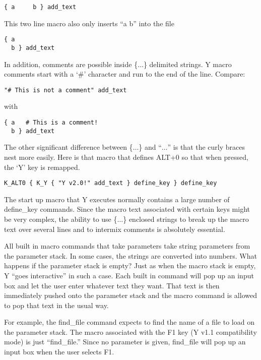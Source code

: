 \begin{verbatim}
{ a     b } add_text
\end{verbatim}

This two line macro also only inserts ``a b'' into the file

\begin{verbatim}
{ a
  b } add_text
\end{verbatim}

In addition, comments are possible inside \{$\ldots$\} delimited strings. Y macro comments start
with a `\#' character and run to the end of the line. Compare:

\begin{verbatim}
"# This is not a comment" add_text
\end{verbatim}

with

\begin{verbatim}
{ a   # This is a comment!
  b } add_text
\end{verbatim}

The other significant difference between \{$\ldots$\} and ``$\ldots$'' is that the curly braces
nest more easily. Here is that macro that defines ALT+0 so that when pressed, the `Y' key is
remapped.

\begin{verbatim}
K_ALT0 { K_Y { "Y v2.0!" add_text } define_key } define_key
\end{verbatim}

The start up macro that Y executes normally contains a large number of define\_key commands.
Since the macro text associated with certain keys might be very complex, the ability to use
\{$\ldots$\} enclosed strings to break up the macro text over several lines and to intermix
comments is absolutely essential.

All built in macro commands that take parameters take string parameters from the parameter
stack. In some cases, the strings are converted into numbers. What happens if the parameter
stack is empty? Just as when the macro stack is empty, Y ``goes interactive'' in such a case.
Each built in command will pop up an input box and let the user enter whatever text they want.
That text is then immediately pushed onto the parameter stack and the macro command is allowed
to pop that text in the usual way.

For example, the find\_file command expects to find the name of a file to load on the parameter
stack. The macro associated with the F1 key (Y v1.1 compatibility mode) is just ``find\_file.''
Since no parameter is given, find\_file will pop up an input box when the user selects F1.

